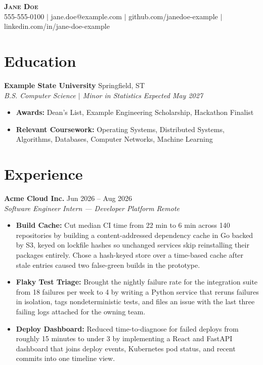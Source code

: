 \documentclass[10pt,letterpaper]{article}
\begin{document}
\begin{center}
    {\Huge \textbf{\scshape Jane Doe}} \\
    \vspace{2pt}
    \small 555-555-0100 $\vert$ jane.doe@example.com $\vert$ github.com/janedoe-example $\vert$ linkedin.com/in/jane-doe-example
\end{center}
\vspace{-3pt}

\section*{Education}
\textbf{Example State University} \hfill Springfield, ST \\[-2pt]
\textit{B.S. Computer Science $\vert$ Minor in Statistics} \hfill \textit{Expected May 2027}
\begin{itemize}[noitemsep,topsep=2pt]
    \item \textbf{Awards:} Dean's List, Example Engineering Scholarship, Hackathon Finalist
    \item \textbf{Relevant Coursework:} Operating Systems, Distributed Systems, Algorithms, Databases, Computer Networks, Machine Learning
\end{itemize}

\section*{Experience}

\textbf{Acme Cloud Inc.} \hfill Jun 2026 -- Aug 2026 \\[-2pt]
\textit{Software Engineer Intern --- Developer Platform} \hfill \textit{Remote}
\begin{itemize}[noitemsep,topsep=2pt]
    \item \textbf{Build Cache:} Cut median CI time from 22 min to 6 min across 140 repositories by building a content-addressed dependency cache in Go backed by S3, keyed on lockfile hashes so unchanged services skip reinstalling their packages entirely. Chose a hash-keyed store over a time-based cache after stale entries caused two false-green builds in the prototype.
    \item \textbf{Flaky Test Triage:} Brought the nightly failure rate for the integration suite from 18 failures per week to 4 by writing a Python service that reruns failures in isolation, tags nondeterministic tests, and files an issue with the last three failing logs attached for the owning team.
    \item \textbf{Deploy Dashboard:} Reduced time-to-diagnose for failed deploys from roughly 15 minutes to under 3 by implementing a React and FastAPI dashboard that joins deploy events, Kubernetes pod status, and recent commits into one timeline view.
\end{itemize}
\end{document}
